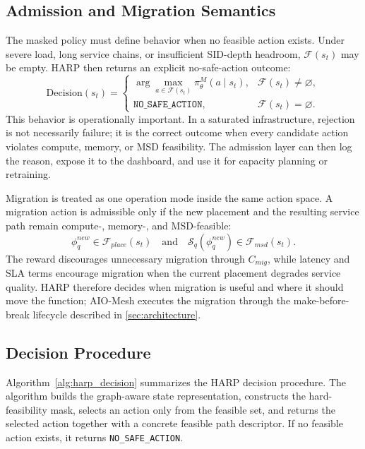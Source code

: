 \documentclass[final,5p]{elsarticle}
\begin{document}
\subsection{Admission and Migration Semantics}
\label{subsec:harp_admission}

The masked policy must define behavior when no feasible action exists. Under severe load, long service chains, or insufficient SID-depth headroom, \(\mathcal{F}(s_t)\) may be empty. HARP then returns an explicit no-safe-action outcome:
\begin{equation}
    \mathrm{Decision}(s_t)=
    \begin{cases}
        \arg\max_{a\in\mathcal{F}(s_t)}\pi_\theta^{M}(a\mid s_t),
        & \mathcal{F}(s_t)\neq\varnothing,\\
        \texttt{NO\_SAFE\_ACTION},
        & \mathcal{F}(s_t)=\varnothing.
    \end{cases}
\end{equation}
This behavior is operationally important. In a saturated infrastructure, rejection is not necessarily failure; it is the correct outcome when every candidate action violates compute, memory, or MSD feasibility. The admission layer can then log the reason, expose it to the dashboard, and use it for capacity planning or retraining.

Migration is treated as one operation mode inside the same action space. A migration action is admissible only if the new placement and the resulting service path remain compute-, memory-, and MSD-feasible:
\begin{equation}
    \phi_q^{new}\in\mathcal{F}_{place}(s_t)
    \quad\text{and}\quad
    \mathcal{S}_q(\phi_q^{new})\in\mathcal{F}_{msd}(s_t).
\end{equation}
The reward discourages unnecessary migration through \(C_{mig}\), while latency and SLA terms encourage migration when the current placement degrades service quality. HARP therefore decides when migration is useful and where it should move the function; AIO-Mesh executes the migration through the make-before-break lifecycle described in \autoref{sec:architecture}.

\subsection{Decision Procedure}
\label{subsec:harp_decision_procedure}

Algorithm~\ref{alg:harp_decision} summarizes the HARP decision procedure. The algorithm builds the graph-aware state representation, constructs the hard-feasibility mask, selects an action only from the feasible set, and returns the selected action together with a concrete feasible path descriptor. If no feasible action exists, it returns \texttt{NO\_SAFE\_ACTION}.
\end{document}
